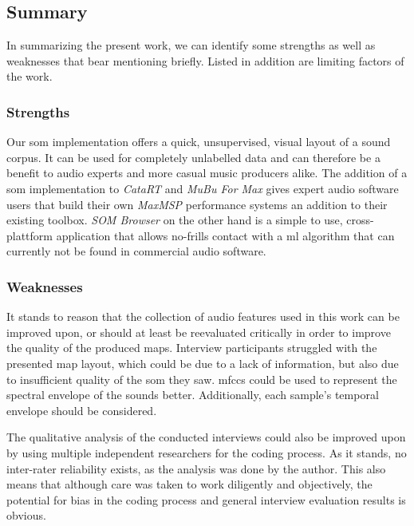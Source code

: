 \subsection{Summary}
\label{subsec:discussion_summary}
In summarizing the present work, we can identify some strengths as well as
weaknesses that bear mentioning briefly. Listed in addition are limiting factors
of the work.

\subsubsection{Strengths}
\label{subsubsec:discussion_strengths}
Our \gls{som} implementation offers a quick, unsupervised, visual layout of a
sound corpus. It can be used for completely unlabelled data and can therefore
be a benefit to audio experts and more casual music producers alike.
The addition of a \gls{som} implementation to \textit{CataRT} and \textit{MuBu
For Max} gives expert audio software users that build their own \textit{MaxMSP}
performance systems an addition to their existing toolbox. \textit{SOM Browser}
on the other hand is a simple to use, cross-plattform application that
allows no-frills contact with a \gls{ml} algorithm that can currently not be
found in commercial audio software.

\subsubsection{Weaknesses}
\label{subsubsec:discussion_weaknesses}
It stands to reason that the collection of audio features used in this work can
be improved upon, or should at least be reevaluated critically in order to
improve the quality of the produced maps. Interview participants struggled with
the presented map layout, which could be due to a lack of information, but also
due to insufficient quality of the \gls{som} they saw. \glspl{mfcc} could be
used to represent the spectral envelope of the sounds better. Additionally,
each sample's temporal envelope should be considered.

\smallskip

The qualitative analysis of the conducted interviews could also be improved upon
by using multiple independent researchers for the coding process. As it stands,
no inter-rater reliability exists, as the analysis was done by the author. This
also means that although care was taken to work diligently and objectively, the
potential for bias in the coding process and general interview evaluation
results is obvious.

